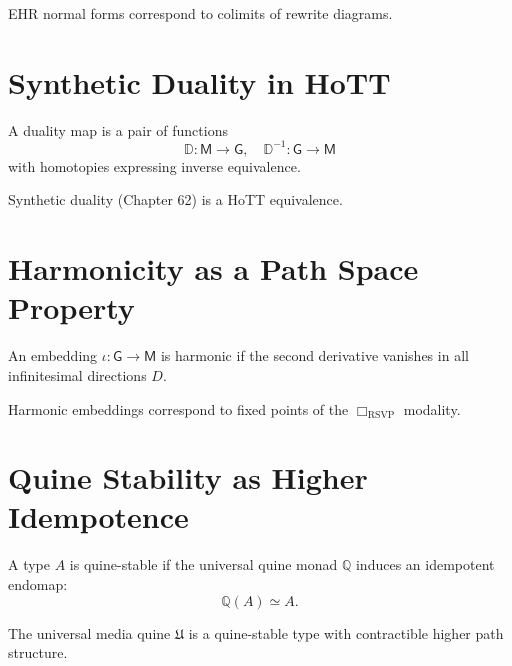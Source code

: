 \begin{proposition}
EHR normal forms correspond to colimits of rewrite diagrams.
\end{proposition}

\section{Synthetic Duality in HoTT}

\begin{definition}
A duality map is a pair of functions
\[
\mathbb{D} : \mathsf{M} \to \mathsf{G}, \quad
\mathbb{D}^{-1} : \mathsf{G} \to \mathsf{M}
\]
with homotopies expressing inverse equivalence.
\end{definition}

\begin{proposition}
Synthetic duality (Chapter 62) is a HoTT equivalence.
\end{proposition}

\section{Harmonicity as a Path Space Property}

\begin{definition}
An embedding $\iota : \mathsf{G} \to \mathsf{M}$ is harmonic if the second derivative vanishes in all infinitesimal directions $D$.
\end{definition}

\begin{proposition}
Harmonic embeddings correspond to fixed points of the $\Box_{\mathrm{RSVP}}$ modality.
\end{proposition}

\section{Quine Stability as Higher Idempotence}

\begin{definition}
A type $A$ is quine-stable if the universal quine monad $\mathbb{Q}$ induces an idempotent endomap:
\[
\mathbb{Q}(A) \simeq A.
\]
\end{definition}

\begin{proposition}
The universal media quine $\mathfrak{U}$ is a quine-stable type with contractible higher path structure.
\end{proposition}

